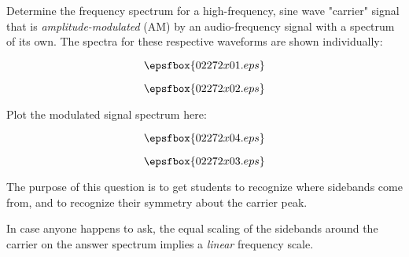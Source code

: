 

Determine the frequency spectrum for a high-frequency, sine wave "carrier" signal that is {\it amplitude-modulated} (AM) by an audio-frequency signal with a spectrum of its own.  The spectra for these respective waveforms are shown individually:

$$\epsfbox{02272x01.eps}$$

$$\epsfbox{02272x02.eps}$$

Plot the modulated signal spectrum here:

$$\epsfbox{02272x04.eps}$$







$$\epsfbox{02272x03.eps}$$







The purpose of this question is to get students to recognize where sidebands come from, and to recognize their symmetry about the carrier peak.

In case anyone happens to ask, the equal scaling of the sidebands around the carrier on the answer spectrum implies a {\it linear} frequency scale.




